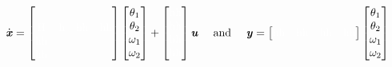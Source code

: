 \begin{equation}
\dot{\text{\textit{\textbf{x}}}} = \begin{bmatrix}
& & & \\[0.3em]
\text{\color{white}H\color{black}} &\text{\color{white}h\color{black}} &\text{\color{white}hh\color{black}} &\text{\color{white}hh\color{black}} \\
\text{\color{white}hh\color{black}}& & & \\
\text{\color{white}hh\color{black}} & & &
\end{bmatrix}
\begin{bmatrix}
\theta_1\\
\theta_2\\
\omega_1\\
\omega_2\\
\end{bmatrix}
+
\begin{bmatrix}
\text{\color{white}hh\color{black}}\\
\text{\color{white}hh\color{black}}\\
\text{\color{white}hh\color{black}}\\
\text{\color{white}hh\color{black}}\\
\end{bmatrix}\text{\textit{\textbf{u}}}
\quad \text{ and } \quad
\text{\textit{\textbf{y}}}=\begin{bmatrix}
\text{\color{white}hh\color{black}} &\text{\color{white}hh\color{black}}&\text{\color{white}hh\color{black}}&\text{\color{white}hh\color{black}}
\end{bmatrix}
\begin{bmatrix}
\theta_1\\
\theta_2\\
\omega_1\\
\omega_2\\
\end{bmatrix}
\label{eq:4}
\end{equation}